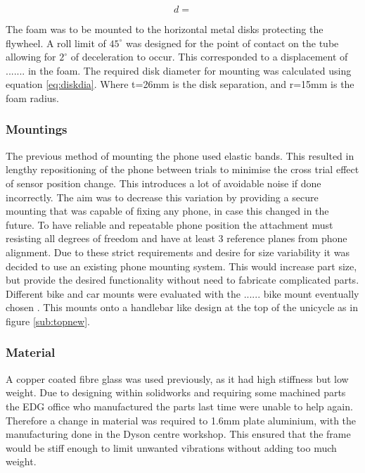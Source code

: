 \documentclass[twoside,twocolumn,12pt]{article}
\begin{document}
\begin{equation}
d = 
\label{eq:diskdia}
\end{equation}

The foam was to be mounted to the horizontal metal disks protecting the flywheel. A roll limit of $45^{\circ}$ was designed for the point of contact on the tube allowing for $2^{\circ}$ of deceleration to occur. This corresponded to a displacement of ....... in the foam. The required disk diameter for mounting was calculated using equation \ref{eq:diskdia}. Where t=26mm is the disk separation, and r=15mm is the foam radius.

\subsubsection{Mountings}
The previous method of mounting the phone used elastic bands. This resulted in lengthy repositioning of the phone between trials to minimise the cross trial effect of sensor position change. This introduces a lot of avoidable noise if done incorrectly. The aim was to decrease this variation by providing a secure mounting that was capable of fixing any phone, in case this changed in the future. 
\newline
To have reliable and repeatable phone position the attachment must resisting all degrees of freedom and have at least 3 reference planes from phone alignment. Due to these strict requirements and desire for size variability it was decided to use an existing phone mounting system. This would increase part size, but provide the desired functionality without need to fabricate complicated parts. Different bike and car mounts were evaluated with the ...... bike mount eventually chosen \cite{bike}. This mounts onto a handlebar like design at the top of the unicycle as in figure \ref{sub:topnew}. 
\subsubsection{Material}
A copper coated fibre glass was used previously, as it had high stiffness but low weight. Due to designing within solidworks and requiring some machined parts the EDG office who manufactured the parts last time were unable to help again. Therefore a change in material was required to 1.6mm plate aluminium, with the manufacturing done in the Dyson centre workshop. This ensured that the frame would be stiff enough to limit unwanted vibrations without adding too much weight. 
\end{document}
